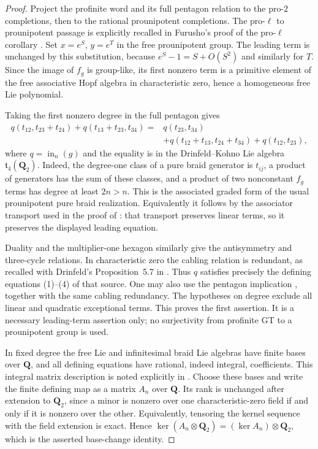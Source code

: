 \begin{proof}
Project the profinite word and its full pentagon relation to the
pro-$2$ completions, then to the rational prounipotent completions.
The pro-$\ell$ to prounipotent passage is explicitly recalled in
Furusho's proof of the pro-$\ell$ corollary
\cite[\S3, p.~554, immediately before Corollary~12]{Furusho2010}.
Set $x=e^S$, $y=e^T$ in the free prounipotent group. The leading
term is unchanged by this substitution, because
$e^S-1=S+O(S^2)$ and similarly for $T$. Since the image of $f_g$
is group-like, its first nonzero term is a primitive element of
the free associative Hopf algebra in characteristic zero, hence
a homogeneous free Lie polynomial.

Taking the first nonzero degree in the full pentagon gives
\begin{align*}
 q(t_{12},t_{23}+t_{24})+q(t_{13}+t_{23},t_{34})
 ={}&q(t_{23},t_{34})\\
   &+q(t_{12}+t_{13},t_{24}+t_{34})+q(t_{12},t_{23}),
\end{align*}
where $q=\operatorname{in}_n(g)$ and the equality is in the
Drinfeld--Kohno Lie algebra $\mathfrak t_4(\mathbf Q_2)$.
Indeed, the degree-one class of a pure braid generator is
$t_{ij}$, a product of generators has the sum of these classes,
and a product of two nonconstant $f_g$ terms has degree at least
$2n>n$. This is the associated graded form of the usual
prounipotent pure braid realization. Equivalently it follows by
the associator transport used in the proof of
\cite[proof of Theorem~2, p.~554]{Furusho2010}: that transport preserves
linear terms, so it preserves the displayed leading equation.

Duality and the multiplier-one hexagon similarly give the
antisymmetry and three-cycle relations. In characteristic zero
the cabling relation is redundant, as recalled with Drinfeld's
Proposition~5.7 in \cite[p.~1, after equation~(6)]{Willwacher}.
Thus $q$ satisfies precisely the defining equations (1)--(4)
of that source. One may also use the pentagon implication
\cite[Theorem~3, pp.~547--548]{Furusho2010}, together with the
same cabling redundancy. The hypotheses on degree exclude all
linear and quadratic exceptional terms. This proves the first
assertion. It is a necessary leading-term assertion only; no
surjectivity from profinite GT to a prounipotent group is used.

In fixed degree the free Lie and infinitesimal braid Lie algebras
have finite bases over $\mathbf Q$, and all defining equations
have rational, indeed integral, coefficients. This integral
matrix description is noted explicitly in
\cite[\S1.1, p.~2]{Willwacher}. Choose these bases and write the
finite defining map as a matrix $A_n$ over $\mathbf Q$.
Its rank is unchanged after extension to $\mathbf Q_2$, since a
minor is nonzero over one characteristic-zero field if and only
if it is nonzero over the other. Equivalently, tensoring the
kernel sequence with the field extension is exact. Hence
$\ker(A_n\otimes\mathbf Q_2)=(\ker A_n)\otimes\mathbf Q_2$,
which is the asserted base-change identity.
\end{proof}

